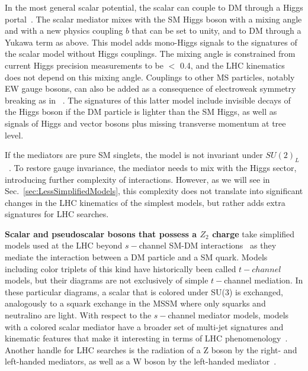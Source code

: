 In the most general scalar potential, the scalar can couple to DM through a Higgs portal~\cite{Berlin:2014cfa}. The scalar mediator mixes with the SM Higgs boson with a mixing angle \sinthetahS and with a new physics coupling $b$ that can be set to unity, and to DM through a Yukawa term as above. This model adds mono-Higgs signals to the signatures of the scalar model without Higgs couplings. The mixing angle is constrained from current Higgs precision measurements to be \sinthetahS $<$ 0.4, and the LHC kinematics does not depend on this mixing angle. Couplings to other MS particles, notably EW gauge bosons, can also be added as a consequence of electroweak symmetry breaking as in ~\cite{Bauer:2016gys,Englert:2016joy}. The signatures of this latter model include invisible decays of the Higgs boson if the DM particle is lighter than the SM Higgs, as well as signals of Higgs and vector bosons plus missing transverse momentum at tree level. 


If the mediators are pure SM singlets, the model is not invariant under $SU(2)_L$~\cite{Bell:2016ekl}. 
To restore gauge invariance, the mediator needs to mix with the Higgs sector, introducing further complexity of interactions. However, as we will see in Sec.~\ref{sec:LessSimplifiedModels}, this complexity does not translate into significant changes in the LHC kinematics of the simplest models, but rather adds extra signatures for LHC searches.

\textbf{Scalar and pseudoscalar bosons that possess a $Z_2$ charge} take simplified models used at the LHC beyond $s-$channel SM-DM interactions~\cite{Bai:2013iqa, Papucci:2014iwa, An:2013xka, Bell:2012rg} as they mediate the interaction between a DM particle and a SM quark. Models including color triplets of this kind have historically been called $t-channel$ models, but their diagrams are not exclusively of simple $t-$channel mediation. In these particular diagrams, a scalar that is colored under SU(3) is exchanged, analogously to a squark exchange in the MSSM where only squarks and neutralino are light.
With respect to the $s-$channel mediator models, models with a colored scalar mediator have a broader set of multi-jet signatures and kinematic features that make it interesting in terms of LHC phenomenology~\cite{Abercrombie:2015wmb}. %
Another handle for LHC searches is the radiation of a Z boson by the right- and left-handed mediators, as well as a W boson by the left-handed mediator~\cite{Bell:2012rg}. 

